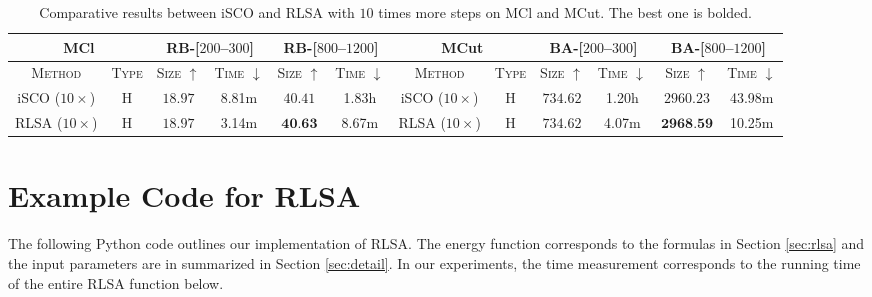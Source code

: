 \begin{table*}[ht!]
\small
\centering
    \caption{Comparative results between iSCO and RLSA with $10$ times more steps on MCl and MCut. The best one is bolded.}
    \vspace{5pt}
    \begin{tabular}{cc|cccc|cc|cccc}

       \multicolumn{2}{c}{\textbf{MCl}} &  \multicolumn{2}{c}{RB-[$200$--$300$]} & \multicolumn{2}{c}{RB-[$800$--$1200$]} &      
       \multicolumn{2}{c}{\textbf{MCut}} &  \multicolumn{2}{c}{BA-[$200$--$300$]} & \multicolumn{2}{c}{BA-[$800$--$1200$]}    \\
           \toprule   %
       \textsc{Method}  &       \textsc{Type}     & \textsc{Size} $\uparrow$  & \textsc{Time} $\downarrow$  & \textsc{Size} $\uparrow$  & \textsc{Time} $\downarrow$ &\textsc{Method}  &       \textsc{Type}     & \textsc{Size} $\uparrow$  & \textsc{Time} $\downarrow$  & \textsc{Size} $\uparrow$  & \textsc{Time} $\downarrow$   \\
    \midrule
    
 iSCO ($10\times$) & H & $18.97$ & 8.81m & $40.41$ &  1.83h & iSCO ($10\times$) & H &  \textbf{$734.62$} & 1.20h &$2960.23$ & 43.98m\\  
   
 RLSA ($10\times$) & H & $18.97$ & 3.14m & $\textbf{40.63}$ & 8.67m & RLSA ($10\times$) & H & $734.62$ & 4.07m & $\textbf{2968.59}$ & 10.25m\\ 
    \bottomrule
    \end{tabular}
    

    \label{tab:long_mc}
\end{table*}

\section{Example Code for RLSA}
\label{sec:code}

The following Python code outlines our implementation of RLSA. The energy function corresponds to the formulas in Section \ref{sec:rlsa} and the input parameters are in summarized in Section \ref{sec:detail}. In our experiments, the time measurement corresponds to the running time of the entire RLSA function below.

